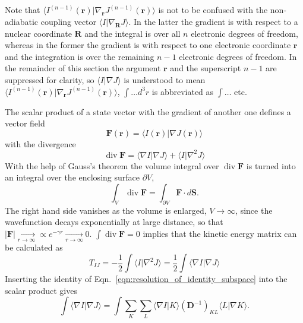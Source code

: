 \documentclass[journal=jacsat,manuscript=article]{achemso}
\DeclareMathOperator{\Div}{div}
\newcommand\m[1]{\mathbf{#1}}
\renewcommand\vec[1]{\mathbf{#1}}
\begin{document}
Note that $\langle I^{(n-1)}(\vec{r}) \vert \nabla_{\vec{r}} J^{(n-1)}(\vec{r}) \rangle$ is not to be confused with the non-adiabatic coupling vector $\langle I \vert \nabla_{\vec{R}} J \rangle$. In the latter the gradient is with respect to a nuclear coordinate $\vec{R}$ and the integral is over all $n$ electronic degrees of freedom, whereas in the former the gradient is with respect to one electronic coordinate $\vec{r}$ and the integration is over the remaining $n-1$ electronic degrees of freedom. In the remainder of this section the argument $\vec{r}$ and the superscript $n-1$ are suppressed for clarity, so $\langle I \vert \nabla J \rangle$ is understood to mean $\langle I^{(n-1)}(\vec{r}) \vert \nabla_{\vec{r}} J^{(n-1)}(\vec{r}) \rangle$, $\int \ldots d^3\!r$ is abbreviated as $\int \ldots$ etc.

The scalar product of a state vector with the gradient of another one defines a vector field
\begin{equation}
\vec{F}(\vec{r}) = \langle I(\vec{r}) \vert \nabla J(\vec{r}) \rangle
\end{equation}
with the divergence
\begin{equation}
\Div \vec{F} = \langle \nabla I \vert \nabla J \rangle + \langle I \vert \nabla^2 J \rangle
\end{equation}
With the help of Gauss's theorem the volume integral over $\Div \vec{F}$ is turned into an integral over the enclosing surface $\partial V$,
\begin{equation}
\int_{V} \Div \vec{F} = \int_{\partial V} \vec{F} \cdot d\vec{S}.
\end{equation}
The right hand side vanishes as the volume is enlarged, $V \to \infty$, since the wavefunction decays exponentially at large distance, so that $\vert \vec{F} \vert \xrightarrow[r \to \infty]{} \propto e^{-\gamma r} \xrightarrow[r \to \infty]{} 0$. $\int \Div \vec{F} = 0$ implies that the kinetic energy matrix can be calculated as
\begin{equation}
T_{IJ} = -\frac{1}{2} \int \langle I \vert \nabla^2 J \rangle = \frac{1}{2} \int \langle \nabla I \vert \nabla J \rangle \label{eqn:kinetic_energy_gradgrad}
\end{equation}
Inserting the identity of Eqn.~\ref{eqn:resolution_of_identity_subspace} into the scalar product gives
\begin{equation}
\int \langle \nabla I \vert \nabla J \rangle = \int \sum_K \sum_L \langle \nabla I \vert K \rangle \left( \m{D}^{-1} \right)_{KL} \langle L \vert \nabla K \rangle. \label{eqn:kinetic_energy_density_2}
\end{equation}
\end{document}
